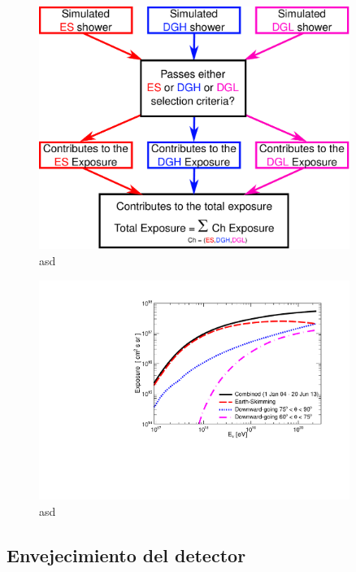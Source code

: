	\begin{figure}[h!]
		\begin{center}
			\includegraphics[width=0.9\textwidth]{fig/resultadosAuger/sketch_combined_4}
			\caption{asd}
			\label{fig:}
		\end{center}
	\end{figure}
	
	\begin{figure}[h!]
		\begin{center}
			\includegraphics[width=0.9\textwidth]{fig/resultadosAuger/exposure_combined_ageing}
			\caption{asd}
			\label{fig:}
		\end{center}
	\end{figure}

	
	\subsection{Envejecimiento del detector}
	
